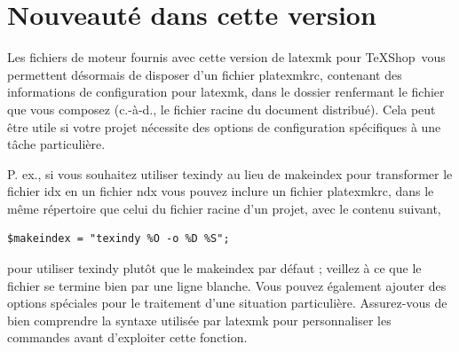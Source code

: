 \documentclass[11pt,french]{article}
\newcommand{\TS}{\textsf{\TeX Shop}}
\newcommand{\cmd}[1]{\textsf{#1}}
\begin{document}
%
%
%

\section{Nouveauté dans cette version}

Les fichiers de moteur fournis avec cette version de \cmd{latexmk} pour \TS\ vous permettent désormais de disposer d'un fichier \cmd{platexmkrc}, contenant des informations de configuration pour \cmd{latexmk}, dans le dossier renfermant le fichier que vous composez (c.-à-d., le fichier racine du document distribué). Cela peut être utile si votre projet nécessite des options de configuration spécifiques à une tâche particulière.

P. ex., si vous souhaitez utiliser \cmd{texindy} au lieu de \cmd{makeindex} pour transformer le fichier \cmd{idx} en un fichier \cmd{ndx} vous pouvez inclure un fichier \cmd{platexmkrc}, dans le même répertoire que celui du fichier racine d'un projet, avec le contenu suivant,
\begin{verbatim}
$makeindex = "texindy %O -o %D %S";
\end{verbatim}
pour utiliser \cmd{texindy} plutôt que le \cmd{makeindex} par défaut ; veillez à ce que le fichier se termine bien par une ligne blanche. Vous pouvez également ajouter des options spéciales pour le traitement d'une situation particulière. Assurez-vous de bien comprendre la syntaxe utilisée par \cmd{latexmk} pour personnaliser les commandes avant d'exploiter cette fonction.
\end{document}
